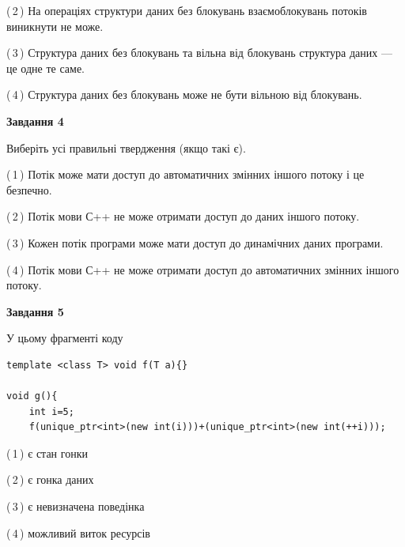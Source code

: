 \documentclass[12pt, ukrainian]{article}
\begin{document}
\begin {large}
{(\,2\,) На операціях структури даних без блокувань взаємоблокувань потоків виникнути не може.%

(\,3\,) Структура даних без блокувань та вільна від блокувань структура даних --- це одне те саме.%

(\,4\,) Структура даних без блокувань може не бути вільною від блокувань.%



\begin{center}
\textbf{Завдання 4}
\end{center}
Виберіть усі правильні твердження (якщо такі є).\par
\vspace{2mm}

(\,1\,) Потік може мати доступ до автоматичних змінних іншого потоку і це безпечно.%

(\,2\,) Потік мови С++ не може отримати доступ до даних іншого потоку.%

(\,3\,) Кожен потік програми може мати доступ до динамічних даних програми.%

(\,4\,) Потік мови С++ не може отримати доступ до автоматичних змінних іншого потоку.%



\begin{center}
\textbf{Завдання 5}
\end{center}
У цьому фрагменті коду
\begin{verbatim}
template <class T> void f(T a){}

void g(){
    int i=5;
    f(unique_ptr<int>(new int(i)))+(unique_ptr<int>(new int(++i)));
\end{verbatim}
(\,1\,) є стан гонки%

(\,2\,) є гонка даних%

(\,3\,) є невизначена поведінка%

(\,4\,) можливий виток ресурсів%


}
\end {large}
\end{document}
